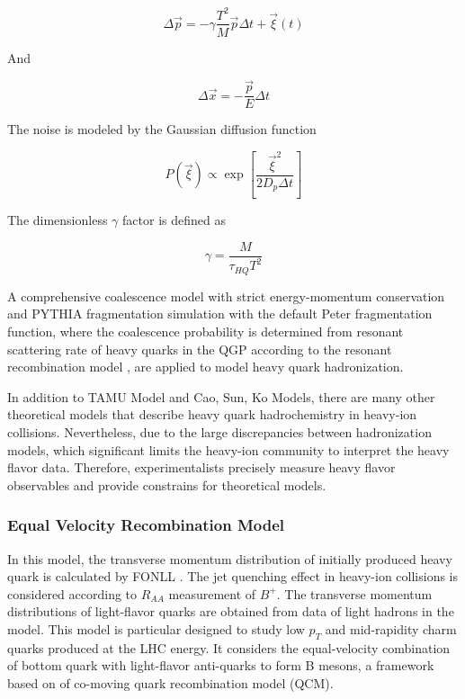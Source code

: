 \begin{equation}
\Delta \vec{p} = - \gamma \frac{T^2}{M} \vec{p} \Delta t + \vec{\xi}(t) 
\end{equation}

And

\begin{equation}
\Delta \vec{x} = - \frac{\vec{p}}{E} \Delta t
\end{equation}

The noise is modeled by the Gaussian diffusion function 

\begin{equation}
P(\vec{\xi}) \propto \exp[\frac{\vec{\xi}^2}{2D_p \Delta t}]
\end{equation}

The dimensionless $\gamma$ factor is defined as

\begin{equation}
\gamma = \frac{M}{\tau_{HQ} T^2}
\end{equation}


A comprehensive coalescence model with strict energy-momentum conservation and PYTHIA fragmentation simulation \cite{PYTHIAFrag} with the default Peter fragmentation function, where the coalescence probability is determined from resonant scattering rate of heavy quarks in the QGP according to the resonant recombination model \cite{RRM1,RRM2}, are applied to model heavy quark hadronization.

In addition to TAMU Model and Cao, Sun, Ko Models, there are many other theoretical models that describe heavy quark hadrochemistry in heavy-ion collisions. Nevertheless, due to the large discrepancies between hadronization models, which significant limits the heavy-ion community to interpret the heavy flavor data. Therefore, experimentalists precisely measure heavy flavor observables and provide constrains for theoretical models.


 
\subsubsection{Equal Velocity Recombination Model}

In this model, the transverse momentum distribution of initially produced heavy quark is calculated by FONLL \cite{QCMModel}. The jet quenching effect in heavy-ion collisions is considered according to $R_{AA}$ measurement of $B^+$. The transverse momentum distributions of light-flavor quarks are obtained from data of light hadrons in the model. This model is particular designed to study low $p_T$ and mid-rapidity charm quarks produced at the LHC energy. It considers the equal-velocity combination of bottom quark with light-flavor anti-quarks  to form B mesons, a framework based on of co-moving quark recombination model (QCM).

